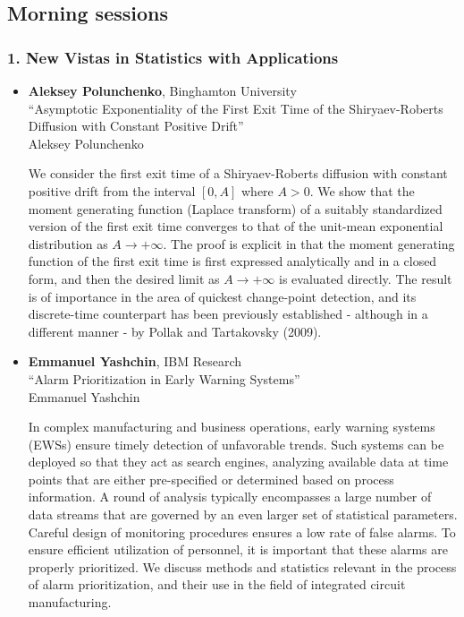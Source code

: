 
\subsection*{Morning sessions}

\subsubsection*{1. New Vistas in Statistics with Applications}

\begin{itemize}
\item \textbf{Aleksey Polunchenko}, Binghamton University \\
``Asymptotic Exponentiality of the First Exit Time of the Shiryaev-Roberts Diffusion with Constant Positive Drift'' \\
Aleksey Polunchenko


We consider the first exit time of a Shiryaev-Roberts diffusion with constant positive drift from the interval $[0,A]$ where $A>0$. We show that the moment generating function (Laplace transform) of a suitably standardized version of the first exit time converges to that of the unit-mean exponential distribution as $A\to+\infty$. The proof is explicit in that the moment generating function of the first exit time is first expressed analytically and in a closed form, and then the desired limit as $A\to+\infty$ is evaluated directly. The result is of importance in the area of quickest change-point detection, and its discrete-time counterpart has been previously established - although in a different manner - by Pollak and Tartakovsky (2009).

\item \textbf{Emmanuel Yashchin}, IBM Research \\
``Alarm Prioritization in Early Warning Systems'' \\
Emmanuel Yashchin


In complex manufacturing and business operations, early warning systems (EWSs) ensure timely detection of unfavorable trends. Such systems can be deployed so that they act as search engines, analyzing available data at time points that are either pre-specified or determined based on process information. A round of analysis typically encompasses a large number of data streams that are governed by an even larger set of statistical parameters. Careful design of monitoring procedures ensures a low rate of false alarms. To ensure efficient utilization of personnel, it is important that these alarms are properly prioritized. We discuss methods and statistics relevant in the process of alarm prioritization, and their use in the field of integrated circuit manufacturing. 


\end{itemize}
